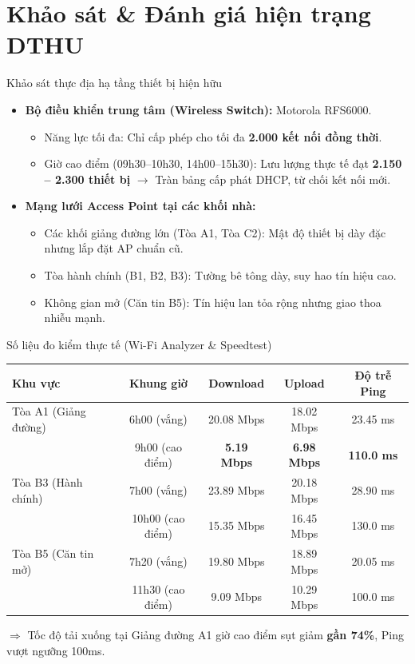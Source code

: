 \documentclass[fleqn]{beamer}
\begin{document}
\section{Khảo sát \& Đánh giá hiện trạng DTHU}

\begin{frame}{Khảo sát thực địa hạ tầng thiết bị hiện hữu}
  \begin{itemize}
    \item \textbf{Bộ điều khiển trung tâm (Wireless Switch):} Motorola RFS6000.
      \begin{itemize}\small
        \item Năng lực tối đa: Chỉ cấp phép cho tối đa \textbf{2.000 kết nối đồng thời}.
        \item Giờ cao điểm (09h30--10h30, 14h00--15h30): Lưu lượng thực tế đạt \textbf{2.150 -- 2.300 thiết bị} $\rightarrow$ Tràn bảng cấp phát DHCP, từ chối kết nối mới.
      \end{itemize}
    \item \textbf{Mạng lưới Access Point tại các khối nhà:}
      \begin{itemize}\small
        \item Các khối giảng đường lớn (Tòa A1, Tòa C2): Mật độ thiết bị dày đặc nhưng lắp đặt AP chuẩn cũ.
        \item Tòa hành chính (B1, B2, B3): Tường bê tông dày, suy hao tín hiệu cao.
        \item Không gian mở (Căn tin B5): Tín hiệu lan tỏa rộng nhưng giao thoa nhiễu mạnh.
      \end{itemize}
  \end{itemize}
\end{frame}

\begin{frame}{Số liệu đo kiểm thực tế (Wi-Fi Analyzer \& Speedtest)}
  \begin{table}\small\centering
  \begin{tabular}{lcccc}
    \toprule
    \textbf{Khu vực} & \textbf{Khung giờ} & \textbf{Download} & \textbf{Upload} & \textbf{Độ trễ Ping} \\
    \midrule
    Tòa A1 (Giảng đường) & 6h00 (vắng) & 20.08 Mbps & 18.02 Mbps & 23.45 ms \\
                         & 9h00 (cao điểm) & \textbf{5.19 Mbps} & \textbf{6.98 Mbps} & \textbf{110.0 ms} \\
    \midrule
    Tòa B3 (Hành chính)  & 7h00 (vắng) & 23.89 Mbps & 20.18 Mbps & 28.90 ms \\
                         & 10h00 (cao điểm)& 15.35 Mbps & 16.45 Mbps & 130.0 ms \\
    \midrule
    Tòa B5 (Căn tin mở)  & 7h20 (vắng) & 19.80 Mbps & 18.89 Mbps & 20.05 ms \\
                         & 11h30 (cao điểm)& 9.09 Mbps & 10.29 Mbps & 100.0 ms \\
    \bottomrule
  \end{tabular}
  \end{table}
  \vspace{0.15cm}
  $\Rightarrow$ Tốc độ tải xuống tại Giảng đường A1 giờ cao điểm sụt giảm \textbf{gần 74\%}, Ping vượt ngưỡng 100ms.
\end{frame}
\end{document}
